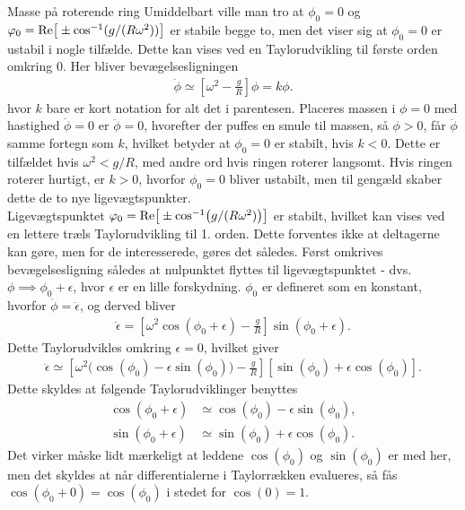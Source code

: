 \documentclass[crop=false, class=memoir]{standalone}
\begin{document}
\begin{opgave}[3]{Masse på roterende ring}
%
Umiddelbart ville man tro at $\phi_0=0$ og $\phi_0=\textup{Re}\big[\pm\cos^{-1}(g/(R\omega^2))\big]$ er stabile begge to, men det viser sig at $\phi_0=0$ er ustabil i nogle tilfælde. Dette kan vises ved en Taylorudvikling til første orden omkring $0$. Her bliver bevægelsesligningen
%
\begin{align*}
	\ddot{\phi} \simeq \left[\omega^2 - \frac{g}{R}\right]\phi = k\phi.
\end{align*}
%
hvor $k$ bare er kort notation for alt det i parentesen. Placeres massen i $\phi = 0$ med hastighed $\dot{\phi}=0$ er $\ddot{\phi}=0$, hvorefter der puffes en smule til massen, så $\phi>0$, får $\ddot{\phi}$ samme fortegn som $k$, hvilket betyder at $\phi_0 = 0$ er stabilt, hvis $k<0$. Dette er tilfældet hvis $\omega^2<g/R$, med andre ord hvis ringen roterer langsomt. Hvis ringen roterer hurtigt, er $k>0$, hvorfor $\phi_0=0$ bliver ustabilt, men til gengæld skaber dette de to nye ligevægtspunkter. \\[2mm]
Ligevægtspunktet $\phi_0=\textup{Re}\big[\pm\cos[-1](g/(R\omega^2))\big]$ er stabilt, hvilket kan vises ved en lettere træls Taylorudvikling til 1. orden. Dette forventes ikke at deltagerne kan gøre, men for de interesserede, gøres det således. Først omkrives bevægelsesligning således at nulpunktet flyttes til ligevægtspunktet - dvs. $\phi \implies \phi_0 + \epsilon$, hvor $\epsilon$ er en lille forskydning. $\phi_0$ er defineret som en konstant, hvorfor $\ddot{\phi} = \ddot{\epsilon}$, og derved bliver
%
\begin{align*}
	\ddot{\epsilon} = \left[\omega^2\cos(\phi_0 + \epsilon) - \frac{g}{R}\right]\sin(\phi_0 + \epsilon).
\end{align*}
%
Dette Taylorudvikles omkring $\epsilon=0$, hvilket giver
%
\begin{align} \label{mek:eq:epsilon}
	\ddot{\epsilon} \simeq \left[\omega^2\Big(\cos(\phi_0)-\epsilon\sin(\phi_0)\Big) - \frac{g}{R}\right]\left[\sin(\phi_0) + \epsilon\cos(\phi_0)\right].
\end{align}
%
Dette skyldes at følgende Taylorudviklinger benyttes
%
\begin{align*}
	\cos(\phi_0 + \epsilon) &\simeq \cos(\phi_0) - \epsilon\sin(\phi_0), \\
	\sin(\phi_0 + \epsilon) &\simeq \sin(\phi_0) + \epsilon\cos(\phi_0).
\end{align*}
%
Det virker måske lidt mærkeligt at leddene $\cos(\phi_0)$ og $\sin(\phi_0)$ er med her, men det skyldes at når differentialerne i Taylorrækken evalueres, så fås
$\cos(\phi_0 + 0) = \cos(\phi_0)$ i stedet for $\cos(0) = 1$. \\[2mm]

\end{opgave}
\end{document}
